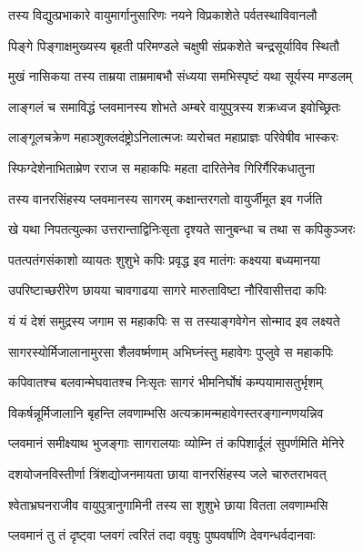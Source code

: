 \twolineshloka
{तस्य विद्युत्प्रभाकारे वायुमार्गानुसारिणः}
{नयने विप्रकाशेते पर्वतस्थाविवानलौ} %

\twolineshloka
{पिङ्गे पिङ्गाक्षमुख्यस्य बृहती परिमण्डले}
{चक्षुषी संप्रकशेते चन्द्रसूर्याविव स्थितौ} %

\twolineshloka
{मुखं नासिकया तस्य ताम्रया ताम्रमाबभौ}
{संध्यया समभिस्पृष्टं यथा सूर्यस्य मण्डलम्} %

\twolineshloka
{लाङ्गलं च समाविद्धं प्लवमानस्य शोभते}
{अम्बरे वायुपुत्रस्य शक्रध्वज इवोच्छ्रितः} %

\twolineshloka
{लाङ्गूलचक्रेण महाञ्शुक्लदंष्ट्रोऽनिलात्मजः}
{व्यरोचत महाप्राज्ञः परिवेषीव भास्करः} %

\twolineshloka
{स्फिग्देशेनाभिताम्रेण रराज स महाकपिः}
{महता दारितेनेव गिरिर्गैरिकधातुना} %

\twolineshloka
{तस्य वानरसिंहस्य प्लवमानस्य सागरम्}
{कक्षान्तरगतो वायुर्जीमूत इव गर्जति} %

\twolineshloka
{खे यथा निपतत्युल्का उत्तरान्ताद्विनिःसृता}
{दृश्यते सानुबन्धा च तथा स कपिकुञ्जरः} %

\twolineshloka
{पतत्पतंगसंकाशो व्यायतः शुशुभे कपिः}
{प्रवृद्ध इव मातंगः कक्ष्यया बध्यमानया} %

\twolineshloka
{उपरिष्टाच्छरीरेण छायया चावगाढया}
{सागरे मारुताविष्टा नौरिवासीत्तदा कपिः} %

\twolineshloka
{यं यं देशं समुद्रस्य जगाम स महाकपिः}
{स स तस्याङ्गवेगेन सोन्माद इव लक्ष्यते} %

\twolineshloka
{सागरस्योर्मिजालानामुरसा शैलवर्ष्मणाम्}
{अभिघ्नंस्तु महावेगः पुप्लुवे स महाकपिः} %

\twolineshloka
{कपिवातश्च बलवान्मेघवातश्च निःसृतः}
{सागरं भीमनिर्घोषं कम्पयामासतुर्भृशम्} %

\twolineshloka
{विकर्षन्नूर्मिजालानि बृहन्ति लवणाम्भसि}
{अत्यक्रामन्महावेगस्तरङ्गान्गणयन्निव} %

\twolineshloka
{प्लवमानं समीक्ष्याथ भुजङ्गाः सागरालयाः}
{व्योम्नि तं कपिशार्दूलं सुपर्णमिति मेनिरे} %

\twolineshloka
{दशयोजनविस्तीर्णा त्रिंशद्योजनमायता}
{छाया वानरसिंहस्य जले चारुतराभवत्} %

\twolineshloka
{श्वेताभ्रघनराजीव वायुपुत्रानुगामिनी}
{तस्य सा शुशुभे छाया वितता लवणाम्भसि} %

\twolineshloka
{प्लवमानं तु तं दृष्ट्वा प्लवगं त्वरितं तदा}
{ववृषुः पुष्पवर्षाणि देवगन्धर्वदानवाः} %

